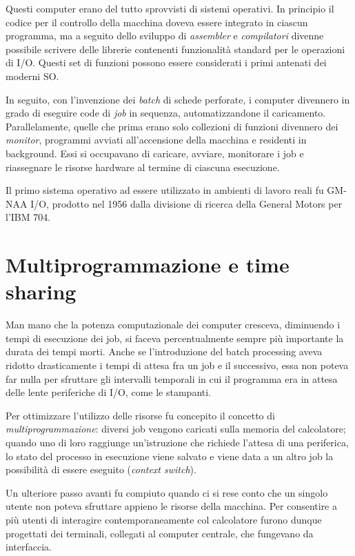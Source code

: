 \documentclass[12pt,a4paper]{report}
\begin{document}
		Questi computer erano del tutto sprovvisti di sistemi operativi. In principio il codice per il controllo della macchina doveva
		essere integrato in ciascun programma, ma a seguito dello sviluppo di \emph{assembler} e \emph{compilatori} divenne
		possibile scrivere delle librerie contenenti funzionalità standard per le operazioni di I/O.
		Questi set di funzioni possono essere considerati i primi antenati dei moderni SO.
		
		In seguito, con l'invenzione dei \emph{batch} di schede perforate, i computer divennero in grado di eseguire
		code di \emph{job} in sequenza, automatizzandone il caricamento. Parallelamente, quelle che prima erano
		solo collezioni di funzioni divennero dei \emph{monitor}, programmi avviati all'accensione della macchina e
		residenti in background. Essi si occupavano di caricare, avviare, monitorare i job e riassegnare le risorse
		hardware al termine di ciascuna esecuzione.
		
		Il primo sistema operativo ad essere utilizzato in ambienti di lavoro reali fu GM-NAA I/O, prodotto
		nel 1956 dalla divisione di ricerca della General Motors per l'IBM 704.
		
	\section{Multiprogrammazione e time sharing}
		Man mano che la potenza computazionale dei computer cresceva, diminuendo i tempi di esecuzione dei job, si faceva
		percentualmente sempre più importante la durata dei tempi morti. Anche se l'introduzione del batch processing aveva
		ridotto drasticamente i tempi di attesa fra un job e il successivo, essa non poteva far nulla per sfruttare gli intervalli
		temporali in cui il programma era in attesa delle lente periferiche di I/O, come le stampanti.
		
		Per ottimizzare l'utilizzo delle risorse fu concepito il concetto di \emph{multiprogrammazione}: diversi job
		vengono caricati sulla memoria del calcolatore; quando uno di loro raggiunge un'istruzione che richiede
		l'attesa di una periferica, lo stato del processo in esecuzione viene salvato e viene data a un altro job
		la possibilità di essere eseguito (\emph{context switch}).
		
		Un ulteriore passo avanti fu compiuto quando ci si rese conto che un singolo utente non poteva sfruttare
		appieno le risorse della macchina. Per consentire a più utenti di interagire contemporaneamente col calcolatore
		furono dunque progettati dei terminali, collegati al computer centrale, che fungevano da interfaccia.
		
\end{document}
